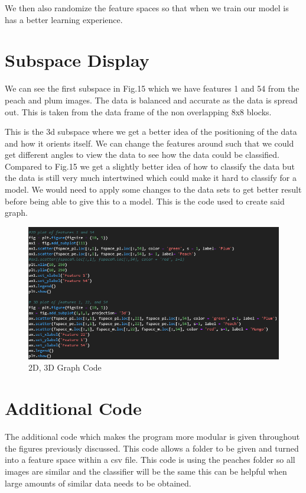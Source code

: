 \documentclass[conference]{IEEEtran}
\begin{document}
We then also randomize the feature spaces so that when we train our model is has a better learning experience.

\section{Subspace Display}
We can see the first subspace in Fig.15 which we have features 1 and 54 from the peach and plum images. The data is balanced and accurate as the data is spread out. This is taken from the data frame of the non overlapping 8x8 blocks.


This is the 3d subspace where we get a better idea of the positioning of the data and how it orients itself. We can change the features around such that we could get different angles to view the data to see how the data could be classified. Compared to Fig.15 we get a slightly better idea of how to classify the data but the data is still very much intertwined which could make it hard to classify for a model. We would need to apply some changes to the data sets to get better result before being able to give this to a model. This is the code used to create said graph.

\begin{figure}[h]
  \centering
  \includegraphics[width=\linewidth]{2d_3d_code.png}
  \caption{2D, 3D Graph Code}
\end{figure}

\section{Additional Code}
The additional code which makes the program more modular is given throughout the figures previously discussed. This code allows a folder to be given and turned into a feature space within a csv file. This code is using the peaches folder so all images are similar and the classifier will be the same this can be helpful when large amounts of similar data needs to be obtained.
\end{document}
